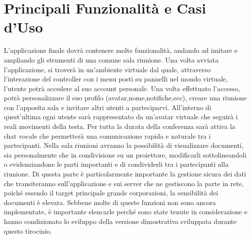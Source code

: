 \section{Principali Funzionalità e Casi d'Uso}
L'applicazione finale dovrà contenere molte funzionalità, andando ad imitare e ampliando gli strumenti di una comune sala riunione. Una volta avviata l'applicazione, si troverà in un'ambiente virtuale dal quale, attraverso l'interazione del controller con i menu posti su pannelli nel mondo virtuale, l'utente potrà accedere al suo account personale. Una volta effettuato l'accesso, potrà personalizzare il suo profilo (avatar,nome,notifiche,ecc), creare una riunione con l'apposita sala e invitare altri utenti a parteciparvi. All'interno di quest'ultima ogni utente sarà rappresentato da un'avatar virtuale che seguirà i reali movimenti della testa. Per tutta la durata della conferenza sarà attiva la chat vocale che permetterà una comunicazione rapida e naturale tra i partecipanti.  Nella sala riunioni avranno la possibilità di visualizzare documenti, sia personalmente che in condivisione su un proiettore, modificarli sottolineandoli o evidenziandone le parti importanti e di condividerli tra i partecipanti alla riunione. Di questa parte è particolarmente importante la gestione sicura dei dati che transiteranno sull'applicazione e sui server che ne gestiscono la parte in rete, poiché essendo il target principale grande corporazioni, la sensibilità dei documenti è elevata. Sebbene molte di queste funzioni non sono ancora implementate, è importante elencarle perché sono state tenute in considerazione e hanno condizionato lo sviluppo della versione dimostrativa sviluppata durante questo tirocinio.\\

